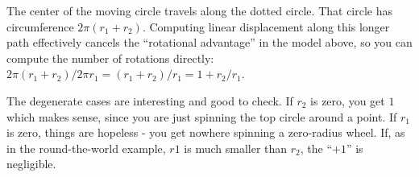 \documentclass[11pt,a4paper]{report}
\theoremstyle{plain}
\theoremstyle{definition}
\theoremstyle{remark}
\begin{document}
The center of the moving circle travels along the dotted circle. That circle has circumference $2\pi(r_1+r_2)$. Computing linear displacement along this longer path effectively cancels the ``rotational advantage'' in the model above, so you can compute the number of rotations directly: $2\pi(r_1+r_2) / 2{\pi}r_1 = (r_1 + r_2) / r_1 = 1 + r_2/r_1$.

The degenerate cases are interesting and good to check.  If $r_2$ is zero, you get $1$ which makes sense, since you are just spinning the top circle around a point.  If $r_1$ is zero, things are hopeless - you get nowhere spinning a zero-radius wheel. If, as in the round-the-world example, $r1$ is much smaller than $r_2$, the ``$+1$'' is negligible.
\end{document}
